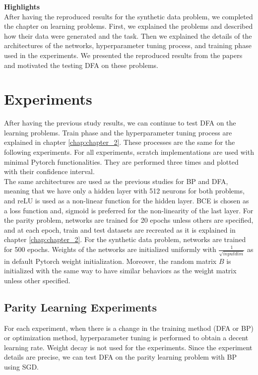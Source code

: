 \documentclass[a4paper, nobind]{templates/ociamthesis}
\begin{document}
\noindent \textbf{Highlights}\\
After having the reproduced results for the synthetic data problem, we completed the chapter on learning problems. First, we explained the problems and described how their data were generated and the task. Then we explained the details of the architectures of the networks, hyperparameter tuning process, and training phase used in the experiments. We presented the reproduced results from the papers and motivated the testing DFA on these problems.

\hypertarget{chap:chapter_3}{%
\chapter{Experiments}\label{chap:chapter_3}}

\noindent After having the previous study results, we can continue to test DFA on the learning problems. Train phase and the hyperparameter tuning process are explained in chapter \ref{chap:chapter_2}. These processes are the same for the following experiments. For all experiments, scratch implementations are used with minimal Pytorch functionalities. They are performed three times and plotted with their confidence interval.\\
The same architectures are used as the previous studies for BP and DFA, meaning that we have only a hidden layer with 512 neurons for both problems, and reLU is used as a non-linear function for the hidden layer. BCE is chosen as a loss function and, sigmoid is preferred for the non-linearity of the last layer. For the parity problem, networks are trained for 20 epochs unless others are specified, and at each epoch, train and test datasets are recreated as it is explained in chapter \ref{chap:chapter_2}. For the synthetic data problem, networks are trained for 500 epochs. Weights of the networks are initialized uniformly with \(\frac{1}{\sqrt{input dim}}\) as in default Pytorch weight initialization. Moreover, the random matrix \(B\) is initialized with the same way to have similar behaviors as the weight matrix unless other specified.

\hypertarget{parity-learning-experiments}{%
\section{Parity Learning Experiments}\label{parity-learning-experiments}}

For each experiment, when there is a change in the training method (DFA or BP) or optimization method, hyperparameter tuning is performed to obtain a decent learning rate. Weight decay is not used for the experiments. Since the experiment details are precise, we can test DFA on the parity learning problem with BP using SGD.
\end{document}
